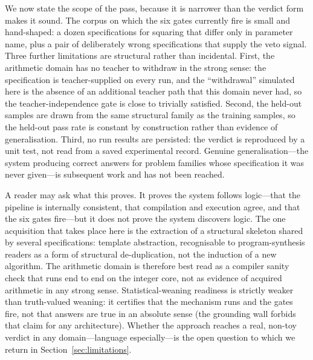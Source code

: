 \documentclass[11pt,a4paper]{article}
\begin{document}
We now state the scope of the pass, because it is narrower than the
verdict form makes it sound. The corpus on which the six gates currently
fire is small and hand-shaped: a dozen specifications for squaring that
differ only in parameter name, plus a pair of deliberately wrong
specifications that supply the veto signal. Three further limitations
are structural rather than incidental. First, the arithmetic domain has
no teacher to withdraw in the strong sense: the specification is
teacher-supplied on every run, and the ``withdrawal'' simulated here is
the absence of an additional teacher path that this domain never had, so
the teacher-independence gate is close to trivially satisfied. Second,
the held-out samples are drawn from the same structural family as the
training samples, so the held-out pass rate is constant by construction
rather than evidence of generalisation. Third, no run results are
persisted: the verdict is reproduced by a unit test, not read from a
saved experimental record. Genuine generalisation---the system producing
correct answers for problem families whose specification it was never
given---is subsequent work and has not been reached.

A reader may ask what this proves. It proves the system follows
logic---that the pipeline is internally consistent, that compilation and
execution agree, and that the six gates fire---but it does not prove the
system discovers logic. The one acquisition that takes place here is the
extraction of a structural skeleton shared by several specifications:
template abstraction, recognisable to program-synthesis readers as a
form of structural de-duplication, not the induction of a new algorithm.
The arithmetic domain is therefore best read as a compiler sanity check
that runs end to end on the integer core, not as evidence of acquired
arithmetic in any strong sense. Statistical-weaning readiness is strictly
weaker than truth-valued weaning: it certifies that the mechanism runs
and the gates fire, not that answers are true in an absolute sense (the
grounding wall forbids that claim for any architecture). Whether the
approach reaches a real, non-toy verdict in any domain---language
especially---is the open question to which we return in
Section~\ref{sec:limitations}.
\end{document}
